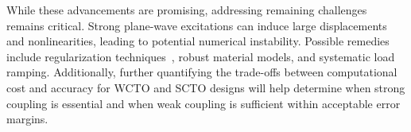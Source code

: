        While these advancements are promising, addressing remaining challenges remains critical.
       Strong plane-wave excitations can induce large displacements and nonlinearities, 
       leading to potential numerical instability. Possible remedies include regularization techniques~\cite{HuHu0}, 
       robust material models, and systematic load ramping. Additionally, further quantifying the trade-offs between
        computational cost and accuracy for WCTO and SCTO designs will help determine when strong coupling is essential
         and when weak coupling is sufficient within acceptable error margins.
